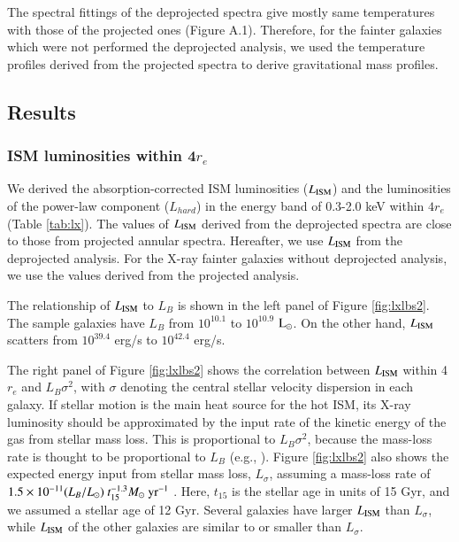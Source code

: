 \documentclass[structabstract]{aa}
\begin{document}
The spectral fittings of the deprojected spectra give mostly same
temperatures with those of the projected ones (Figure A.1).
Therefore,  for the fainter galaxies
 which were not performed the deprojected analysis,
we used  the temperature profiles derived  from the projected spectra
 to derive gravitational mass profiles.

\addtocounter{table}{1}


\subsection{Results}

\subsubsection{ISM luminosities within 4$r_e$}


We derived the absorption-corrected ISM luminosities ($L_{{\rm ISM}}$) and 
the  luminosities  of the power-law component ($L_{hard}$)
in the energy band of 0.3-2.0 keV within $4r_e$ (Table \ref{tab:lx}).
The values of  $L_{{\rm ISM}}$ derived from the deprojected 
spectra are close to those from projected annular spectra.
Hereafter, we use  $L_{{\rm ISM}}$ from the deprojected analysis.
For the X-ray fainter galaxies without deprojected analysis,
we use the values derived from the projected analysis.

The relationship of  $L_{{\rm ISM}}$  to $L_B$ is shown in the
left panel of Figure \ref{fig:lxlbs2}. The sample galaxies have $L_B$
from $10^{10.1}$ to $10^{10.9}$ ${\rm L_\odot}$.
On the other hand, $L_{{\rm ISM}}$ scatters from $10^{39.4}$ erg/s to $10^{42.4}$
erg/s. 

The right panel of Figure \ref{fig:lxlbs2} shows the correlation between
$L_{{\rm ISM}}$ within 4$r_e$ and $L_B\sigma^2$, with $\sigma$ denoting the
central stellar velocity dispersion
in each galaxy. If stellar motion is the main heat source for the hot
ISM, its X-ray luminosity should be approximated by the input rate of
the kinetic energy of the gas from stellar mass loss. This is
proportional to $L_B\sigma^2$, because the mass-loss rate is thought to be
proportional to $L_B$ (e.g., \citealt{Ciot1991}). Figure
\ref{fig:lxlbs2} also shows the
expected energy input from stellar mass loss, $L_\sigma$, assuming a mass-loss
rate of $1.5 \times 10^{-11} (L_B/L_{\odot})~
t_{15}^{-1.3} M_{\odot}~{\rm yr}^{-1}$ \citep{Ciot1991}. Here,
$t_{15}$ is the stellar age in units of 15 Gyr, and we assumed a stellar
age of 12 Gyr. Several galaxies have larger $L_{{\rm ISM}}$ than $L_\sigma$, while $L_{{\rm ISM}}$ of
the other galaxies are similar to or smaller than $L_\sigma$. 
\end{document}
